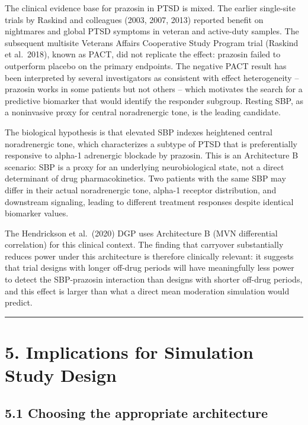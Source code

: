\documentclass[
]{article}
\begin{document}
The clinical evidence base for prazosin in PTSD is mixed. The
earlier single-site trials by Raskind and colleagues (2003,
2007, 2013) reported benefit on nightmares and global PTSD
symptoms in veteran and active-duty samples. The subsequent
multisite Veterans Affairs Cooperative Study Program trial
(Raskind et al.~2018), known as PACT, did not replicate the
effect: prazosin failed to outperform placebo on the primary
endpoints. The negative PACT result has been interpreted by
several investigators as consistent with effect heterogeneity --
prazosin works in some patients but not others -- which
motivates the search for a predictive biomarker that would
identify the responder subgroup. Resting SBP, as a noninvasive
proxy for central noradrenergic tone, is the leading candidate.

The biological hypothesis is that elevated SBP indexes
heightened central noradrenergic tone, which characterizes a
subtype of PTSD that is preferentially responsive to alpha-1
adrenergic blockade by prazosin. This is an Architecture B
scenario: SBP is a proxy for an underlying neurobiological
state, not a direct determinant of drug pharmacokinetics. Two
patients with the same SBP may differ in their actual
noradrenergic tone, alpha-1 receptor distribution, and
downstream signaling, leading to different treatment responses
despite identical biomarker values.

The Hendrickson et al.~(2020) DGP uses Architecture B (MVN
differential correlation) for this clinical context. The
finding that carryover substantially reduces power under this
architecture is therefore clinically relevant: it suggests that
trial designs with longer off-drug periods will have
meaningfully less power to detect the SBP-prazosin interaction
than designs with shorter off-drug periods, and this effect is
larger than what a direct mean moderation simulation would
predict.

\bigskip\noindent

\rule{\textwidth}{0.4pt}\bigskip

\section{5. Implications for Simulation Study Design}

\subsection{5.1 Choosing the appropriate architecture}
\end{document}
